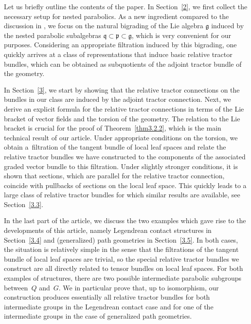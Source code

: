 \documentclass[10pt,a4paper]{amsart}
\numberwithin{equation}{section}
\def\frak{\mathfrak}
\begin{document}
Let us briefly outline the contents of the paper. In Section~\ref{2}, we first collect the
necessary setup for nested parabolics. As a new ingredient compared to the discussion
in \cite{Rel-BGG1,Rel-BGG2}, we focus on the natural bigrading of the Lie algebra
$\frak g$ induced by the nested parabolic subalgebras $\frak q\subset\frak
p\subset\frak g$, which is very convenient for our purposes. Considering an
appropriate filtration induced by this bigrading, one quickly arrives at a class of
representations that induce basic relative tractor bundles, which can be obtained as
subquotients of the adjoint tractor bundle of the geometry.

In Section~\ref{3}, we start by showing that the relative tractor connections on the
bundles in our class are induced by the adjoint tractor connection. Next, we derive an
explicit formula for the relative tractor connections in terms of the Lie bracket of
vector fields and the torsion of the geometry. The relation to the Lie bracket is
crucial for the proof of Theorem~\ref{thm3.2.2}, which is the main technical result
of our article. Under appropriate conditions on the torsion, we obtain a~filtration
of the tangent bundle of local leaf spaces and relate the relative tractor bundles we
have constructed to the components of the associated graded vector bundle to this
filtration. Under slightly stronger conditions, it is shown that sections, which are
parallel for the relative tractor connection, coincide with pullbacks of sections on
the local leaf space. This quickly leads to a large class of relative tractor bundles
for which similar results are available, see Section~\ref{3.3}.

In the last part of the article, we discuss the two examples which gave rise to the
developments of this article, namely Legendrean contact structures in Section~\ref{3.4}
and (generalized) path geometries in Section~\ref{3.5}. In both cases, the situation is
relatively simple in the sense that the filtrations of the tangent bundle of local
leaf spaces are trivial, so the special relative tractor bundles we construct are all
directly related to tensor bundles on local leaf spaces. For both examples of
structures, there are two possible intermediate parabolic subgroups between~$Q$ and~$G$.
We in particular prove that, up to isomorphism, our construction produces
essentially all relative tractor bundles for both intermediate groups in the
Legendrean contact case and for one of the intermediate groups in the case of
generalized path geometries.
\end{document}
